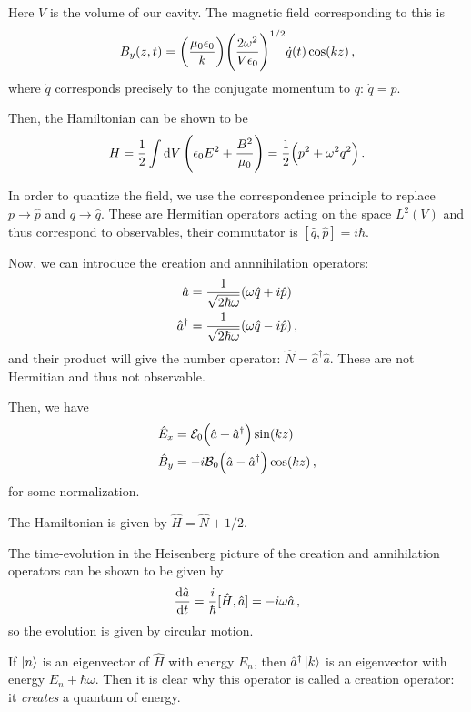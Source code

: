 \documentclass[main.tex]{subfiles}
\begin{document}
Here \(V\) is the volume of our cavity. The magnetic field corresponding to this is 
%
\begin{align}
B_y (z, t) = \qty(\frac{\mu_0 \epsilon_0  }{k}) \qty(\frac{2 \omega^2}{V \epsilon_0 })^{1/2} \dot{q}(t) \cos(kz)
\,,
\end{align}
%
where \(\dot{q}\) corresponds precisely to the conjugate momentum to \(q\): \(\dot{q} = p\). 

Then, the Hamiltonian can be shown to be 
%
\begin{align}
H =\frac{1}{2} \int \dd{V} \qty(\epsilon_0 E^2 + \frac{B^2}{\mu_0 }) 
= \frac{1}{2} \qty(p^2 + \omega^2 q^2)
\,.
\end{align}

In order to quantize the field, we use the correspondence principle to replace \(p \rightarrow \hat{p}\) and \(q \rightarrow \hat{q}\). These are Hermitian operators acting on the space \(L^2(V)\) and thus correspond to observables, their commutator is \([\hat{q}, \hat{p}] = i \hbar\). 

Now, we can introduce the creation and annnihilation operators: 
%
\begin{align}
\hat{a} &= \frac{1}{\sqrt{2 \hbar \omega }} \qty(\omega \hat{q} + i \hat{p})  \\
\hat{a}^\dag &= \frac{1}{\sqrt{2 \hbar \omega }} \qty(\omega \hat{q} - i \hat{p})  
\,,
\end{align}
%
and their product will give the number operator: \(\hat{N} = \hat{a}^\dag \hat{a}\). These are not Hermitian and thus not observable. 

Then, we have 
%
\begin{align}
\hat{E}_{x} &= \mathcal{E}_{0} \qty(\hat{a} + \hat{a}^\dag) \sin(kz) \\
\hat{B}_{y} &= -i \mathcal{B}_{0} \qty(\hat{a} - \hat{a}^\dag) \cos(kz)
\,,
\end{align}
%
for some normalization.

The Hamiltonian is given by \(\hat{H} = \hat{N} + 1/2\). 

The time-evolution in the Heisenberg picture of the creation and annihilation operators can be shown to be given by 
%
\begin{align}
\dv{\hat{a} }{t} = \frac{i}{\hbar} [\hat{H}, \hat{a}] = - i \omega \hat{a}
\,,
\end{align}
%
so the evolution is given by circular motion. 

If \(\ket{n} \) is an eigenvector of \(\hat{H}\) with energy \(E_n\), then \(\hat{a}^\dag \ket{k} \) is an eigenvector with energy \(E_n + \hbar \omega \). Then it is clear why this operator is called a creation operator: it \emph{creates} a quantum of energy. 
\end{document}
